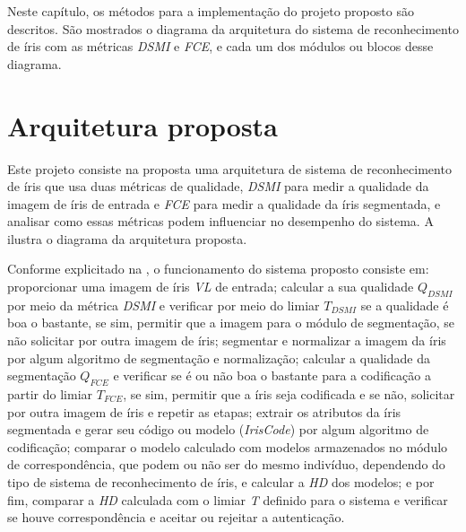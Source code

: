 
\par Neste capítulo, os métodos para a implementação do projeto proposto são descritos. São mostrados o diagrama da arquitetura do sistema de reconhecimento de íris com as métricas \textit{\acrfull{DSMI}} e \textit{\acrfull{FCE}}, e cada um dos módulos ou blocos desse diagrama.


\section{Arquitetura proposta} \label{sec:metodologia:arquitetura}

\par Este projeto consiste na proposta uma arquitetura de sistema de reconhecimento de íris que usa duas métricas de qualidade, \textit{\acrfull{DSMI}} para medir a qualidade da imagem de íris de entrada e \textit{\acrfull{FCE}} para medir a qualidade da íris segmentada, e analisar como essas métricas podem influenciar no desempenho do sistema. A  ilustra o diagrama da arquitetura proposta.


\par Conforme explicitado na , o funcionamento do sistema proposto consiste em: proporcionar uma imagem de íris \textit{\acrfull{VL}} de entrada; calcular a sua qualidade $Q_{DSMI}$ por meio da métrica \textit{\acrshort{DSMI}} e verificar por meio do limiar $T_{DSMI}$ se a qualidade é boa o bastante, se sim, permitir que a imagem para o módulo de segmentação, se não solicitar por outra imagem de íris; segmentar e normalizar a imagem da íris por algum algoritmo de segmentação e normalização; calcular a qualidade da segmentação $Q_{FCE}$ e verificar se é ou não boa o bastante para a codificação a partir do limiar $T_{FCE}$, se sim, permitir que a íris seja codificada e se não, solicitar por outra imagem de íris e repetir as etapas; extrair os atributos da íris segmentada e gerar seu código ou modelo (\textit{IrisCode}) por algum algoritmo de codificação; comparar o modelo calculado com modelos armazenados no módulo de correspondência, que podem ou não ser do mesmo indivíduo, dependendo do tipo de sistema de reconhecimento de íris, e calcular a \textit{\acrfull{HD}} dos modelos; e por fim, comparar a \textit{\acrshort{HD}} calculada com o limiar \textit{T} definido para o sistema e verificar se houve correspondência e aceitar ou rejeitar a autenticação.

